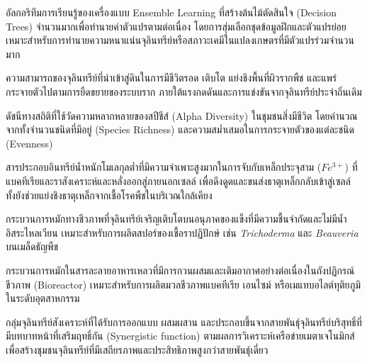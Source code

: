 \begin{description}[leftmargin=1.8cm, style=nextline, font=\bfseries\color{agriGreen}]
\item[Random Forest Regressor (RFR)]
อัลกอริทึมการเรียนรู้ของเครื่องแบบ Ensemble Learning ที่สร้างต้นไม้ตัดสินใจ (Decision Trees) จำนวนมากเพื่อทำนายค่าตัวแปรตามต่อเนื่อง โดยการสุ่มเลือกชุดข้อมูลฝึกและตัวแปรย่อย เหมาะสำหรับการทำนายความหนาแน่นจุลินทรีย์หรือสภาวะเคมีในแปลงเกษตรที่มีตัวแปรร่วมจำนวนมาก

\item[Rhizosphere Competence]
ความสามารถของจุลินทรีย์ที่นำเข้าสู่ดินในการมีชีวิตรอด เติบโต แย่งชิงพื้นที่ผิวรากพืช และแพร่กระจายตัวไปตามการยืดขยายของระบบราก ภายใต้แรงกดดันและการแข่งขันจากจุลินทรีย์ประจำถิ่นเดิม

\item[Shannon-Wiener Diversity Index ($H'$)]
ดัชนีทางสถิติที่ใช้วัดความหลากหลายของสปีชีส์ (Alpha Diversity) ในชุมชนสิ่งมีชีวิต โดยคำนวณจากทั้งจำนวนชนิดที่มีอยู่ (Species Richness) และความสม่ำเสมอในการกระจายตัวของแต่ละชนิด (Evenness)

\item[Siderophores]
สารประกอบอินทรีย์น้ำหนักโมเลกุลต่ำที่มีความจำเพาะสูงมากในการจับกับเหล็กประจุสาม ($Fe^{3+}$) ที่แบคทีเรียและราสังเคราะห์และหลั่งออกสู่ภายนอกเซลล์ เพื่อดึงดูดและขนส่งธาตุเหล็กกลับเข้าสู่เซลล์ ทั้งยังช่วยแย่งชิงธาตุเหล็กจากเชื้อโรคพืชในบริเวณใกล้เคียง

\item[Solid-State Fermentation (SSF)]
กระบวนการหมักทางชีวภาพที่จุลินทรีย์เจริญเติบโตบนอนุภาคของแข็งที่มีความชื้นจำกัดและไม่มีน้ำอิสระไหลเวียน เหมาะสำหรับการผลิตสปอร์ของเชื้อราปฏิปักษ์ เช่น \textit{Trichoderma} และ \textit{Beauveria} บนเมล็ดธัญพืช

\item[Submerged Fermentation (SmF)]
กระบวนการหมักในสารละลายอาหารเหลวที่มีการกวนผสมและเติมอากาศอย่างต่อเนื่องในถังปฏิกรณ์ชีวภาพ (Bioreactor) เหมาะสำหรับการผลิตมวลชีวภาพแบคทีเรีย เอนไซม์ หรือเมแทบอไลต์ทุติยภูมิในระดับอุตสาหกรรม

\item[Synthetic Microbial Communities (SynComs)]
กลุ่มจุลินทรีย์สังเคราะห์ที่ได้รับการออกแบบ ผสมผสาน และประกอบขึ้นจากสายพันธุ์จุลินทรีย์บริสุทธิ์ที่มีบทบาทหน้าที่เสริมฤทธิ์กัน (Synergistic function) ตามผลการวิเคราะห์เครือข่ายเมตาเจโนมิกส์ เพื่อสร้างชุมชนจุลินทรีย์ที่มีเสถียรภาพและประสิทธิภาพสูงกว่าสายพันธุ์เดี่ยว


\end{description}
